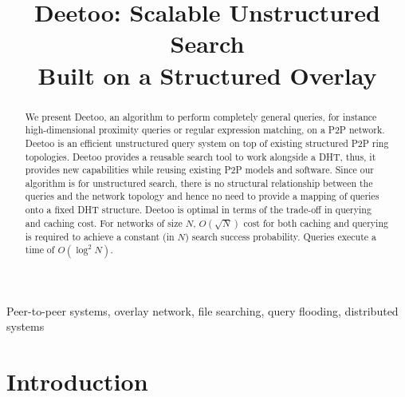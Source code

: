 \documentclass[conference]{IEEEtran}
\begin{document}
\title{Deetoo: Scalable Unstructured Search \\
	Built on a Structured Overlay}
\author{
\and
{}
}
\maketitle

\begin{abstract}

We present Deetoo, an algorithm to perform completely general queries,
for instance high-dimensional proximity queries or regular expression
matching, on a P2P network.  
Deetoo is an efficient unstructured query system on top of existing 
structured P2P ring topologies.
Deetoo provides a reusable search tool to work alongside a DHT, thus,
it provides new capabilities while reusing existing P2P models and software.
Since our algorithm is for unstructured search, there is
no structural relationship between the queries and the network topology
and hence no need to provide a mapping of queries onto a fixed DHT structure.
Deetoo is optimal in terms of the trade-off in querying and caching cost.
For networks of size $N$,
$O(\sqrt{N})$ cost for both caching and querying is required to achieve
a constant (in $N$) search success probability.  Queries execute a time
of $O(\log^2 N)$.
\end{abstract}

\begin{IEEEkeywords}
Peer-to-peer systems, overlay network, file searching,
query flooding, distributed systems
\end{IEEEkeywords}
\IEEEpeerreviewmaketitle
\section{Introduction}\label{sec:introduction} 
\end{document}
